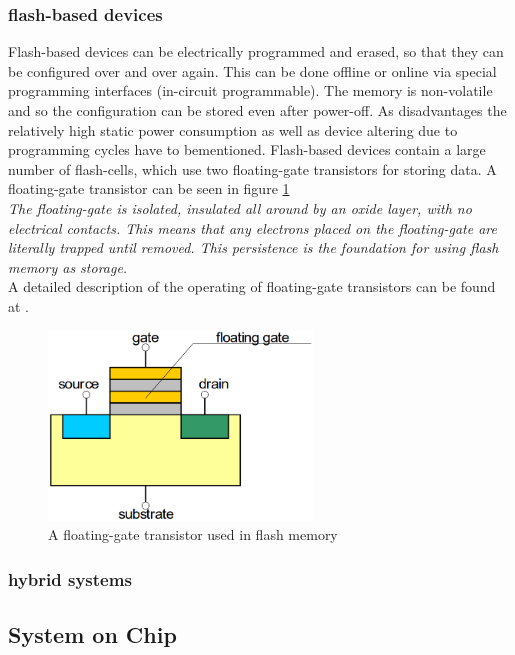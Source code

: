 \subsubsection{flash-based devices}
Flash-based devices can be electrically programmed and erased, so that they can be configured over and over again. This can be done offline or online via special programming interfaces (in-circuit programmable). The memory is non-volatile and so the configuration can be stored even after power-off. As disadvantages the relatively high static power consumption\cite{Qui16} as well as device altering due to programming cycles have to bementioned. Flash-based devices contain a large number of flash-cells, which use two floating-gate transistors for storing data. A floating-gate transistor can be seen in figure \ref{fig:FlashTransistor}\\
\textit{The floating-gate is isolated, insulated all around by an oxide layer, with no electrical contacts. This means that any electrons placed on the floating-gate are literally trapped until removed. This persistence is the foundation for using flash memory as storage.}\cite{Flash16}\\
A detailed description of the operating of floating-gate transistors can be found at \cite{Cse16}.\\

\begin{figure}[htbp]
\begin{center}
\includegraphics[width=7cm,keepaspectratio=true]{bilder/png/FlashTransistor}
\caption{A floating-gate transistor used in flash memory\cite{Core16}}
\label{fig:FlashTransistor}
\end{center}
\end{figure}
\subsubsection{hybrid systems}
\subsection{System on Chip}
